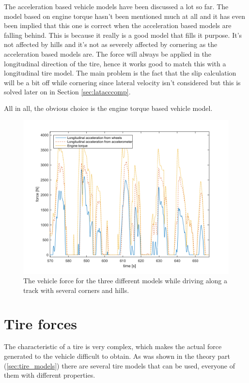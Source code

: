 The acceleration based vehicle models have been discussed a lot so far. The model based on engine torque hasn't been mentioned much at all and it has even been implied that this one is correct when the acceleration based models are falling behind. This is because it really is a good model that fills it purpose. It's not affected by hills and it's not as severely affected by cornering as the acceleration based models are. The force will always be applied in the longitudinal direction of the tire, hence it works good to match this with a longitudinal tire model. The main problem is the fact that the slip calculation will be a bit off while cornering since lateral velocity isn't considered but this is solved later on in Section \ref{sec:latacccomp}. 

All in all, the obvious choice is the engine torque based vehicle model.

\begin{figure}[h]
	\centering
	\includegraphics[width=1\textwidth]{Pictures/vehicle_model_comp_mm2}
	\caption{The vehicle force for the three different models while driving along a track with several corners and hills.}
	\label{vehicle_model_comp_mm2}
\end{figure}

\section{Tire forces}
\label{tire_forces}
The characteristic of a tire is very complex, which makes the actual force generated to the vehicle difficult to obtain. As was shown in the theory part (\ref{sec:tire_models}) there are several tire models that can be used, everyone of them with different properties.


